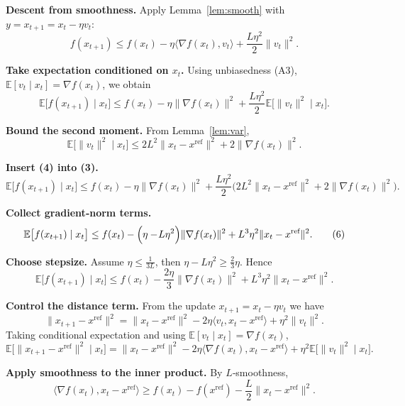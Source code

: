 \documentclass{article}
\newcommand{\E}{\mathbb{E}}
\begin{document}
\begin{enumerate}[label=\textbf{[Step \arabic*]}, leftmargin=*]
\item \textbf{Descent from smoothness.}  
Apply Lemma~\ref{lem:smooth} with $y=x_{t+1}=x_t-\eta v_t$:
\[
f(x_{t+1})\le f(x_t)-\eta\langle\nabla f(x_t),v_t\rangle+\frac{L\eta^{2}}{2}\|v_t\|^{2}.
\tag{2}
\]

\item \textbf{Take expectation conditioned on $x_t$.}  
Using unbiasedness (A3), $\E[v_t\mid x_t]=\nabla f(x_t)$, we obtain
\[
\E\bigl[f(x_{t+1})\mid x_t\bigr]\le f(x_t)-\eta\|\nabla f(x_t)\|^{2}
+\frac{L\eta^{2}}{2}\E\bigl[\|v_t\|^{2}\mid x_t\bigr].
\tag{3}
\]

\item \textbf{Bound the second moment.}  
From Lemma~\ref{lem:var},
\[
\E\bigl[\|v_t\|^{2}\mid x_t\bigr]\le 2L^{2}\|x_t-x^{\text{ref}}\|^{2}+2\|\nabla f(x_t)\|^{2}.
\tag{4}
\]

\item \textbf{Insert (4) into (3).}
\[
\E\bigl[f(x_{t+1})\mid x_t\bigr]\le f(x_t)-\eta\|\nabla f(x_t)\|^{2}
+\frac{L\eta^{2}}{2}\bigl(2L^{2}\|x_t-x^{\text{ref}}\|^{2}+2\|\nabla f(x_t)\|^{2}\bigr).
\tag{5}
\]

\item \textbf{Collect gradient‑norm terms.}
\[
\E\bigl[f(x_{t+1})\mid x_t\bigr]\le f(x_t)
-\Bigl(\eta-\!L\eta^{2}\Bigr)\|\nabla f(x_t)\|^{2}
+L^{3}\eta^{2}\|x_t-x^{\text{ref}}\|^{2}.
\tag{6}
\]

\item \textbf{Choose stepsize.}  
Assume $\eta\le\frac{1}{3L}$, then $\eta-L\eta^{2}\ge\frac{2}{3}\eta$. Hence
\[
\E\bigl[f(x_{t+1})\mid x_t\bigr]\le f(x_t)
-\frac{2\eta}{3}\|\nabla f(x_t)\|^{2}
+L^{3}\eta^{2}\|x_t-x^{\text{ref}}\|^{2}.
\tag{7}
\]

\item \textbf{Control the distance term.}  
From the update $x_{t+1}=x_t-\eta v_t$ we have
\[
\|x_{t+1}-x^{\text{ref}}\|^{2}
= \|x_t-x^{\text{ref}}\|^{2}
-2\eta\langle v_t, x_t-x^{\text{ref}}\rangle
+\eta^{2}\|v_t\|^{2}.
\tag{8}
\]
Taking conditional expectation and using $\E[v_t\mid x_t]=\nabla f(x_t)$,
\[
\E\bigl[\|x_{t+1}-x^{\text{ref}}\|^{2}\mid x_t\bigr]
= \|x_t-x^{\text{ref}}\|^{2}
-2\eta\langle \nabla f(x_t),x_t-x^{\text{ref}}\rangle
+\eta^{2}\E\bigl[\|v_t\|^{2}\mid x_t\bigr].
\tag{9}
\]

\item \textbf{Apply smoothness to the inner product.}  
By $L$‑smoothness,
\[
\langle \nabla f(x_t),x_t-x^{\text{ref}}\rangle
\ge f(x_t)-f(x^{\text{ref}})-\frac{L}{2}\|x_t-x^{\text{ref}}\|^{2}.
\tag{10}
\]


\end{enumerate}
\end{document}
